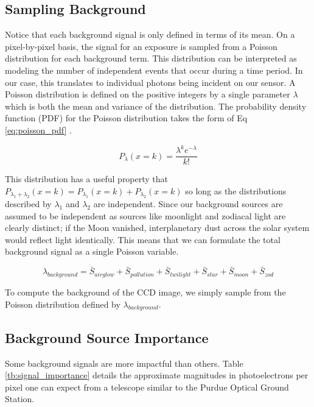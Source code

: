 \subsection{Sampling Background}

Notice that each background signal is only defined in terms of its mean. On a pixel-by-pixel basis, the signal for an exposure is sampled from a Poisson distribution for each background term. This distribution can be interpreted as modeling the number of independent events that occur during a time period. In our case, this translates to individual photons being incident on our sensor. A Poisson distribution is defined on the positive integers by a single parameter $\lambda$ which is both the mean and variance of the distribution. The probability density function (PDF) for the Poisson distribution takes the form of Eq \ref{eq:poisson_pdf} \cite{frueh2019notes}.

\begin{equation} \label{eq:poisson_pdf}
  P_\lambda(x=k) = \frac{\lambda^k e^{-\lambda}}{k!}
\end{equation}

This distribution has a useful property that $P_{\lambda_1 + \lambda_2}(x=k) = P_{\lambda_1}(x=k) + P_{\lambda_2}(x=k)$ so long as the distributions described by $\lambda_1$ and $\lambda_2$ are independent. Since our background sources are assumed to be independent as sources like moonlight and zodiacal light are clearly distinct; if the Moon vanished, interplanetary dust across the solar system would reflect light identically. This means that we can formulate the total background signal as a single Poisson variable.

\begin{equation} \label{eq:background_poisson}
  \lambda_{background} = \bar{S}_{airglow} + \bar{S}_{pollution} + \bar{S}_{twilight} + \bar{S}_{star} + \bar{S}_{moon} + \bar{S}_{zod}
\end{equation}

To compute the background of the CCD image, we simply sample from the Poisson distribution defined by $\lambda_{background}$. 

\subsection{Background Source Importance}

Some background signals are more impactful than others. Table \ref{tb:signal_importance} details the approximate magnitudes in photoelectrons per pixel one can expect from a telescope similar to the Purdue Optical Ground Station.

